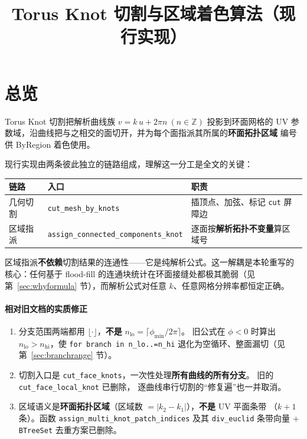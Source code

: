 \documentclass{article}
\title{Torus Knot 切割与区域着色算法（现行实现）}
\date{}
\begin{document}
\maketitle

\section{总览}

Torus Knot 切割把解析曲线族 $v = k\,u + 2\pi n\ (n\in\mathbb{Z})$ 投影到环面网格的
UV 参数域，沿曲线把与之相交的面切开，并为每个面指派其所属的\textbf{环面拓扑区域}
编号供 ByRegion 着色使用。

现行实现由两条彼此独立的链路组成，理解这一分工是全文的关键：

\begin{center}
\begin{tabular}{@{}p{2.4cm}p{5.2cm}p{5.4cm}@{}}
\hline
\textbf{链路} & \textbf{入口} & \textbf{职责} \\
\hline
几何切割 & \texttt{cut\_mesh\_by\_knots} & 插顶点、加弦、标记 \texttt{cut} 屏障边 \\
区域指派 & \texttt{assign\_connected\_}\-\texttt{components\_knot} & 逐面按\textbf{解析拓扑不变量}算区域号 \\
\hline
\end{tabular}
\end{center}

区域指派\textbf{不依赖}切割结果的连通性——它是纯解析公式。这一解耦是本轮重写的
核心：任何基于 flood-fill 的连通块统计在环面接缝处都极其脆弱（见
第~\ref{sec:whyformula} 节），而解析公式对任意 $k$、任意网格分辨率都恒定正确。

\paragraph{相对旧文档的实质修正}
\begin{enumerate}
\item 分支范围两端都用 $\lfloor\cdot\rfloor$，\textbf{不是} $n_{\mathrm{lo}}=\lceil\phi_{\min}/2\pi\rceil$。
  旧公式在 $\phi<0$ 时算出 $n_{\mathrm{lo}}>n_{\mathrm{hi}}$，使 \texttt{for branch in n\_lo..=n\_hi}
  退化为空循环、整面漏切（见第~\ref{sec:branchrange} 节）。
\item 切割入口是 \texttt{cut\_face\_knots}，一次性处理\textbf{所有曲线的所有分支}。
  旧的 \texttt{cut\_face\_local\_knot} 已删除，
  逐曲线串行切割的“修复遍”也一并取消。
\item 区域语义是\textbf{环面拓扑区域}（区域数 $=|k_2-k_1|$），\textbf{不是} UV 平面条带
  （$k+1$ 条）。函数 \texttt{assign\_multi\_knot\_patch\_indices} 及其
  \texttt{div\_euclid} 条带向量 + \texttt{BTreeSet} 去重方案已删除。
\end{enumerate}
\end{document}
